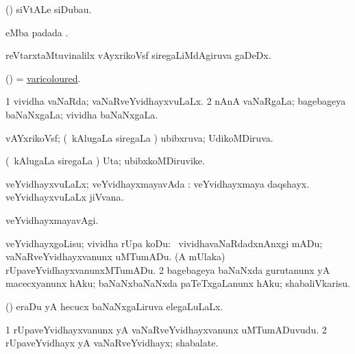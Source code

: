 \bentry
{} 
\gl{\nA}
\expl{}
\bmng
 (\veYshA) siVtALe siDubau. 
\emng
\eentry

\bentry
{} 
\gl{\nA}
\expl{}
\bmng
  eMba padada \bava. 
\emng
\eentry

\bentry
{} 
\gl{\nA}
\expl{}
\bmng
 reVtarxtaMtuvinalilx vAyxrikoVsf siregaLiMdAgiruva gaDeDx. 
\emng
\eentry

\bentry
{} 
\gl{\gu}
\expl{}
\bmng
 (\ame) = \hyperlink{varicoloured}{varicoloured}. 
\emng
\eentry

\bentry
{} 
\gl{\gu}
\expl{}
\bmng
\bnum
\num{1} vividha vaNaRda; vaNaRveYvidhayxvuLaLx. 
\num{2} nAnA vaNaRgaLa; bagebageya baNaNxgaLa; vividha baNaNxgaLa. 
\enum
\emng
\eentry

\bentry
{} 
\gl{\gu}
\expl{}
\bmng
 vAYxrikoVsf; (\kanmu\ kAlugaLa siregaLa \vi) ubibxruva; UdikoMDiruva. 
\emng
\eentry

\bentry
{} 
\gl{\nA}
\expl{}
\bmng
 (\kanmu\ kAlugaLa siregaLa \vi) Uta; ubibxkoMDiruvike. 
\emng
\eentry

\bentry
{} 
\gl{\gu}
\expl{}
\bmng
 veYvidhayxvuLaLx; veYvidhayxmayavAda :  veYvidhayxmaya daqshayx.  veYvidhayxvuLaLx jiVvana. 
\emng
\eentry

\bentry
{} 
\gl{\kirxvi}
\expl{}
\bmng
 veYvidhayxmayavAgi. 
\emng
\eentry

\bentry
{} 
\gl{\sakirx}
\expl{}
\bmng
\bnum
{} veYvidhayxgoLisu; vividha rUpa koDu: 
\banum
{} \kanmu\ vividhavaNaRdadxnAnxgi mADu; vaNaRveYvidhayxvanunx uMTumADu. 
 (A mUlaka) rUpaveYvidhayxvanunxMTumADu. 
\eanum
\numie
\num{2} bagebageya baNaNxda gurutanunx yA macecxyanunx hAku; baNaNxbaNaNxda paTeTxgaLanunx hAku; shabaliVkarisu. 
\enum
\emng
\eentry

\bentry
{} 
\gl{\gu}
\expl{}
\bmng
 (\savi) eraDu yA hecucx baNaNxgaLiruva elegaLuLaLx. 
\emng
\eentry

\bentry
{} 
\gl{\nA}
\expl{}
\bmng
\bnum
\num{1} rUpaveYvidhayxvanunx yA vaNaRveYvidhayxvanunx uMTumADuvudu. 
\num{2} rUpaveYvidhayx yA vaNaRveYvidhayx; shabalate. 
\enum
\emng
\eentry


